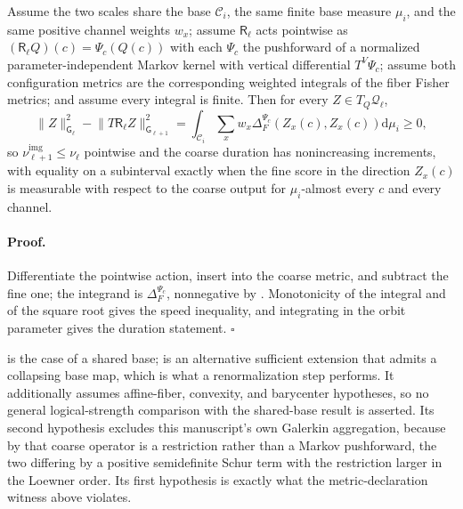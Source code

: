 Assume the two scales share the base $\mathcal C_i$, the same finite base
measure $\mu_i$, and the same positive channel weights $w_x$; assume
$\mathsf R_\ell$ acts pointwise as
$(\mathsf R_\ell Q)(c)=\Psi_c(Q(c))$ with each $\Psi_c$ the pushforward of a
normalized parameter-independent Markov kernel with vertical differential
$T^V\Psi_c$; assume both configuration metrics are the corresponding weighted
integrals of the fiber Fisher metrics; and assume every integral is finite.
Then for every $Z\in T_Q\mathcal Q_\ell$,
\begin{equation}
\lVert Z\rVert^2_{\mathsf G_\ell}
-\lVert T\mathsf R_\ell Z\rVert^2_{\mathsf G_{\ell+1}}
=\int_{\mathcal C_i}\sum_xw_x\Delta_F^{\Psi_c}(Z_x(c),Z_x(c))\mathrm d\mu_i
\geq0,
\label{eq:hist-pointwise-contraction-lift}
\end{equation}
so $\nu^{\mathrm{img}}_{\ell+1}\leq\nu_\ell$ pointwise and the coarse duration
has nonincreasing increments, with equality on a subinterval exactly when the
fine score in the direction $Z_x(c)$ is measurable with respect to the coarse
output for $\mu_i$-almost every $c$ and every channel.  

\paragraph{Proof.}
Differentiate the pointwise action, insert into the coarse metric, and subtract
the fine one; the integrand is $\Delta_F^{\Psi_c}$, nonnegative by
.  Monotonicity of the integral and of the
square root gives the speed inequality, and integrating in the orbit parameter
gives the duration statement.  $\square$

 is the case of a shared base;
 is an alternative sufficient extension that
admits a collapsing base map, which is what a renormalization step performs.
It additionally assumes affine-fiber, convexity, and barycenter hypotheses, so
no general logical-strength comparison with the shared-base result is asserted.
Its second hypothesis excludes this manuscript's own Galerkin aggregation, because by
 that coarse operator is a restriction
rather than a Markov pushforward, the two differing by a positive semidefinite
Schur term with the restriction larger in the Loewner order.  Its first
hypothesis is exactly what the metric-declaration witness above violates.

